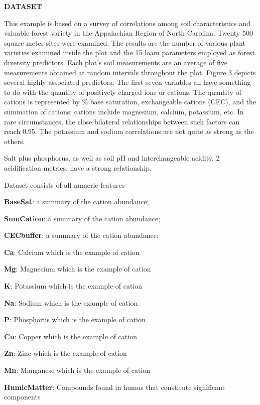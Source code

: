 \documentclass{article} %
\begin{document}
\noindent \textbf{DATASET}

\noindent This example is based on a survey of correlations among soil characteristics and valuable forest variety in the Appalachian Region of North Carolina. Twenty 500 square meter sites were examined. The results are the number of various plant varieties examined inside the plot and the 15 loam parameters employed as forest diversity predictors. Each plot's soil measurements are an average of five measurements obtained at random intervals throughout the plot. Figure 3 depicts several highly associated predictors. The first seven variables all have something to do with the quantity of positively charged ions or cations. The quantity of cations is represented by \% base saturation, exchangeable cations (CEC), and the summation of cations; cations include magnesium, calcium, potassium, etc. In rare circumstances, the close bilateral relationships between such factors can reach 0.95. The potassium and sodium correlations are not quite as strong as the others.

\noindent Salt plus phosphorus, as well as soil pH and interchangeable acidity, 2 acidification metrics, have a strong relationship.

\noindent Dataset consists of all numeric features

\noindent \textbf{BaseSat}: a summary of the cation abundance; 

\noindent \textbf{SumCation}: a summary of the cation abundance; 

\noindent \textbf{CECbuffer}: a summary of the cation abundance; 

\noindent \textbf{Ca}: Calcium which is the example of cation 

\noindent \textbf{Mg}: Magnesium which is the example of cation

\noindent \textbf{K}: Potassium which is the example of cation

\noindent \textbf{Na}: Sodium which is the example of cation 

\noindent \textbf{P}: Phosphorus which is the example of cation 

\noindent \textbf{Cu}: Copper which is the example of cation 

\noindent \textbf{Zn}: Zinc which is the example of cation 

\noindent \textbf{Mn}: Manganese which is the example of cation 

\noindent \textbf{HumicMatter}: Compounds found in humus that constitute significant components
\end{document}
